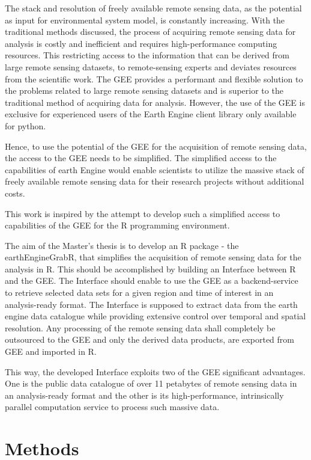\documentclass[11pt,twoside,a4paper,final]{report}
\begin{document}
The stack and resolution of freely available remote sensing data, as the potential as input for environmental system model, is constantly increasing. 
With the traditional methods discussed, the process of acquiring remote sensing data for analysis is costly and inefficient and requires high-performance computing resources.
This restricting access to the information that can be derived from large remote sensing datasets, to remote-sensing experts and deviates resources from the scientific work.
The GEE provides a performant and flexible solution to the problems related to large remote sensing datasets and is superior to the traditional method of acquiring data for analysis.
However, the use of the GEE is exclusive for experienced users of the Earth Engine client library only available for python.

Hence, to use the potential of the GEE for the acquisition of remote sensing data, the access to the GEE needs to be simplified.
The simplified access to the capabilities of earth Engine would enable scientists to utilize the massive stack of freely available remote sensing data for their research projects without additional costs.

This work is inspired by the attempt to develop such a simplified access to capabilities of the GEE for the R programming environment.

The aim of the Master's thesis is to develop an R package - the earthEngineGrabR,  that simplifies the acquisition of remote sensing data for the analysis in R. This should be accomplished by building an Interface between R and the GEE.
The Interface should enable to use the GEE as a backend-service to retrieve selected data sets for a given region and time of interest in an analysis-ready format. The Interface is supposed to extract data from the earth engine data catalogue while providing extensive control over temporal and spatial resolution. 
Any processing of the remote sensing data shall completely be outsourced to the GEE and only the derived data products, are exported from GEE and imported in R. 

This way, the developed Interface exploits two of the GEE significant advantages. One is the public data catalogue of over 11 petabytes of remote sensing data in an analysis-ready format and the other is its high-performance, intrinsically parallel computation service to process such massive data.


\chapter{Methods}
\end{document}
